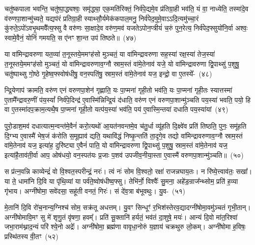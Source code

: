 चतु॑ष्कपाला भवन्ति॒ चतु॑ष्पा॒द्ध्यश्वः॒ समृ॑द्ध्या॒ एक॒मति॑रिक्तं॒ निर्व॑पे॒द्यमे॒व प्र॑तिग्रा॒ही भव॑ति॒ यं वा॒ नाध्येति॒ तस्मा॑दे॒व व॑रुणपा॒शान्मु॑च्यते॒ यद्यप॑रं प्रतिग्रा॒ही स्याथ्सौ॒र्यमेक॑कपाल॒मनु॒ निर्व॑पेद॒मुमे॒वा\-ऽऽ\-दि॒त्यमु॑च्चा॒रं कु॑रुते॒\-ऽपो॑\-ऽवभृ॒थमवै᳚त्य॒फ्सु वै वरु॑णः सा॒क्षादे॒व वरु॑ण॒मव॑ यजते\-ऽपोन॒प्त्रीयं॑ च॒रुं पुन॒रेत्य॒ निर्व॑पेद॒फ्सुयो॑नि॒र्वा अश्वः॒ स्वामे॒वैनं॒ योनिं॑ गमयति॒ स ए॑नꣳ शा॒न्त उप॑ तिष्ठते॥~(४७)

{\anuvakamend[{मु॒ञ्च॒ति॒ च॒रुꣳ स॒प्तद॑श च}]}%

या वा॑मिन्द्रावरुणा यत॒व्या॑ त॒नूस्तये॒ममꣳह॑सो मुञ्चतं॒ या वा॑मिन्द्रावरुणा सह॒स्या॑ रक्ष॒स्या॑ तेज॒स्या॑ त॒नूस्तये॒ममꣳह॑सो मुञ्चतं॒ यो वा॑मिन्द्रावरुणाव॒ग्नौ स्राम॒स्तं वा॑मे॒तेनाव॑ यजे॒ यो वा॑मिन्द्रावरुणा द्वि॒पाथ्सु॑ प॒शुषु॒ चतु॑ष्पाथ्सु गो॒ष्ठे गृ॒हेष्व॒फ्स्वोष॑धीषु॒ वन॒स्पति॑षु॒ स्राम॒स्तं वा॑मे॒तेनाव॑ यज॒ इन्द्रो॒ वा ए॒तस्ये᳚-~(४८)

न्द्रि॒येणाप॑ क्रामति॒ वरु॑ण एनं वरुणपा॒शेन॑ गृह्णाति॒ यः पा॒प्मना॑ गृही॒तो भव॑ति॒ यः पा॒प्मना॑ गृही॒तः स्यात्तस्मा॑ ए॒तामै᳚न्द्रावरु॒णीं प॑य॒स्यां᳚ निर्व॑पे॒दिन्द्र॑ ए॒वास्मि॑न्निन्द्रि॒यं द॑धाति॒ वरु॑ण एनं वरुणपा॒शान्मु॑ञ्चति पय॒स्या॑ भवति॒ पयो॒ हि वा ए॒तस्मा॑दप॒क्राम॒त्यथै॒ष पा॒प्मना॑ गृही॒तो यत्प॑य॒स्या॑ भव॑ति॒ पय॑ ए॒वास्मि॒न्तया॑ दधाति पय॒स्या॑यां~(४९)

पुरो॒डाश॒मव॑ दधात्यात्म॒न्वन्त॑मे॒वैनं॑ करो॒त्यथो॑ आ॒यत॑नवन्तमे॒व च॑तु॒र्धा व्यू॑हति दि॒क्ष्वे॑व प्रति॑ तिष्ठति॒ पुनः॒ समू॑हति दि॒ग्भ्य ए॒वास्मै॑ भेष॒जं क॑रोति स॒मूह्याव॑ द्यति॒ यथावि॑द्धं निष्कृ॒न्तति॑ ता॒दृगे॒व तद्यो वा॑मिन्द्रावरुणाव॒ग्नौ स्राम॒स्तं वा॑मे॒तेनाव॑ यज॒ इत्या॑ह॒ दुरि॑ष्ट्या ए॒वैनं॑ पाति॒ यो वा॑मिन्द्रावरुणा द्वि॒पाथ्सु॑ प॒शुषु॒ स्राम॒स्तं वा॑मे॒तेनाव॑ यज॒ इत्या॑है॒ताव॑ती॒र्वा आप॒ ओष॑धयो॒ वन॒स्पत॑यः प्र॒जाः प॒शव॑ उपजीव॒नीया॒स्ता ए॒वास्मै॑ वरुणपा॒शान्मु॑ञ्चति॥~(५०)

{\anuvakamend[{ए॒तस्य॑ पय॒स्या॑यां पाति॒ षड्विꣳ॑शतिश्च}]}%

स प्र॑त्न॒वन्नि काव्येन्द्रं॑ वो वि॒श्वत॒स्परीन्द्रं॒ नरः॑। त्वं नः॑ सोम वि॒श्वतो॒ रक्षा॑ राजन्नघाय॒तः। न रि॑ष्ये॒त्त्वाव॑तः॒ सखा᳚। या ते॒ धामा॑नि दि॒वि या पृ॑थि॒व्यां या पर्व॑ते॒ष्वोष॑धीष्व॒फ्सु। तेभि॑र्नो॒ विश्वैः᳚ सु॒मना॒ अहे॑ड॒न्राज᳚न्थ्सोम॒ प्रति॑ ह॒व्या गृ॑भाय। अग्नी॑षोमा॒ सवे॑दसा॒ सहू॑ती वनतं॒ गिरः॑। सं दे॑व॒त्रा ब॑भूवथुः। यु॒व-~(५१)

मे॒तानि॑ दि॒वि रो॑च॒नान्य॒ग्निश्च॑ सोम॒ सक्र॑तू अधत्तम्। यु॒वꣳ सिन्धूꣳ॑ र॒भिश॑स्तेरव॒द्यादग्नी॑षोमा॒वमु॑ञ्चतं गृभी॒तान्। अग्नी॑षोमावि॒मꣳ सु मे॑ शृणु॒तं वृ॑षणा॒ हवम्᳚। प्रति॑ सू॒क्तानि॑ हर्यतं॒ भव॑तं दा॒शुषे॒ मयः॑। आन्यं दि॒वो मा॑त॒रिश्वा॑ जभा॒राम॑थ्नाद॒न्यं परि॑ श्ये॒नो अद्रेः᳚। अग्नी॑षोमा॒ ब्रह्म॑णा वावृधा॒नोरुं य॒ज्ञाय॑ चक्रथुरु लो॒कम्। अग्नी॑षोमा ह॒विषः॒ प्रस्थि॑तस्य वी॒तꣳ~(५२)

